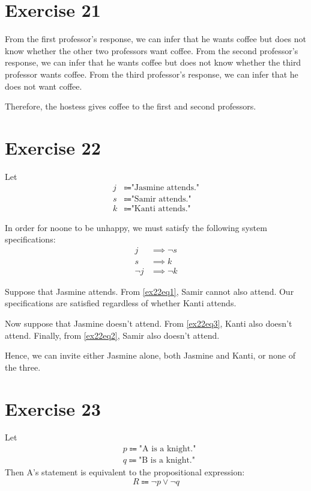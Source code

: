 \documentclass{article}
\begin{document}
\section{Exercise 21}
From the first professor's response, we can infer that he wants coffee but does not know whether the other two professors want coffee.  From the second professor's response, we can infer that he wants coffee but does not know whether the third professor wants coffee. From the third professor's response, we can infer that he does not want coffee.

Therefore, the hostess gives coffee to the first and second professors.

\pagebreak

\section{Exercise 22}
Let
\begin{align*}
	j & \Coloneqq \text{"Jasmine attends."} \\
	s & \Coloneqq \text{"Samir attends."}   \\
	k & \Coloneqq \text{"Kanti attends."}
\end{align*}

In order for noone to be unhappy, we must satisfy the following system specifications:
\begin{align}
	j &\implies \neg s \label{ex22eq1} \\
	s &\implies k \label{ex22eq2}      \\
	\neg j &\implies \neg k \label{ex22eq3}
\end{align}

Suppose that Jasmine attends. From \eqref{ex22eq1}, Samir cannot also attend. Our specifications are satisfied regardless of whether Kanti attends.

Now suppose that Jasmine doesn't attend. From \eqref{ex22eq3}, Kanti also doesn't attend. Finally, from \eqref{ex22eq2}, Samir also doesn't attend.

Hence, we can invite either Jasmine alone, both Jasmine and Kanti, or none of the three.

\pagebreak

\section{Exercise 23}
Let
\begin{align*}
	 & p \Coloneqq \text{"A is a knight."} \\
	 & q \Coloneqq \text{"B is a knight."}
\end{align*}
Then A's statement is equivalent to the propositional expression:
\[
	R \Coloneqq \neg p \lor \neg q
\]
\end{document}
